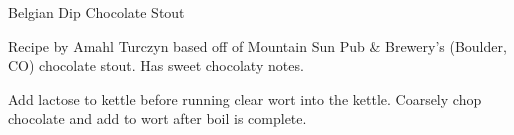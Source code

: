 \stylesection{\stylesweetstout}

\begin{recipe}{Belgian Dip Chocolate Stout}

\begin{aboutblock}
Recipe by Amahl Turczyn based off of Mountain Sun Pub \& Brewery's
(Boulder, CO) chocolate stout. Has sweet chocolaty notes.
\end{aboutblock}


\begin{methodandtiming}
 
\begin{mashsteps}
\end{mashsteps}

\begin{directions}
Add lactose to kettle before running clear wort into the kettle. Coarsely chop
chocolate and add to wort after boil is complete.
\end{directions}

\end{methodandtiming}

\recipebreak

\begin{ingredientsblock}

\begin{malts}
\end{malts}

\begin{hops}
\end{hops}


\end{ingredientsblock}

\end{recipe}

